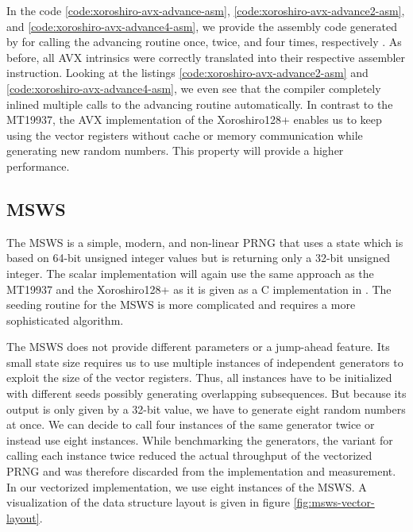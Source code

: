 \documentclass{stdlocal}
\begin{document}
    In the code \ref{code:xoroshiro-avx-advance-asm}, \ref{code:xoroshiro-avx-advance2-asm}, and \ref{code:xoroshiro-avx-advance4-asm}, we provide the assembly code generated by  for calling the advancing routine once, twice, and four times, respectively \autocite{compiler-explorer}.
    As before, all AVX intrinsics were correctly translated into their respective assembler instruction.
    Looking at the listings \ref{code:xoroshiro-avx-advance2-asm} and \ref{code:xoroshiro-avx-advance4-asm}, we even see that the compiler completely inlined multiple calls to the advancing routine automatically.
    In contrast to the MT19937, the AVX implementation of the Xoroshiro128+ enables us to keep using the vector registers without cache or memory communication while generating new random numbers.
    This property will provide a higher performance.


  \subsection{MSWS} %
  \label{sub:middle_square_weyl_generator}
    The MSWS is a simple, modern, and non-linear PRNG that uses a state which is based on 64-bit unsigned integer values but is returning only a 32-bit unsigned integer.
    The scalar implementation will again use the same approach as the MT19937 and the Xoroshiro128+ as it is given as a C implementation in \textcite{widynski2019}.
    The seeding routine for the MSWS is more complicated and requires a more sophisticated algorithm.

    The MSWS does not provide different parameters or a jump-ahead feature.
    Its small state size requires us to use multiple instances of independent generators to exploit the size of the vector registers.
    Thus, all instances have to be initialized with different seeds possibly generating overlapping subsequences.
    But because its output is only given by a 32-bit value, we have to generate eight random numbers at once.
    We can decide to call four instances of the same generator twice or instead use eight instances.
    While benchmarking the generators, the variant for calling each instance twice reduced the actual throughput of the vectorized PRNG and was therefore discarded from the implementation and measurement.
    In our vectorized implementation, we use eight instances of the MSWS.
    A visualization of the data structure layout is given in figure \ref{fig:msws-vector-layout}.
\end{document}

